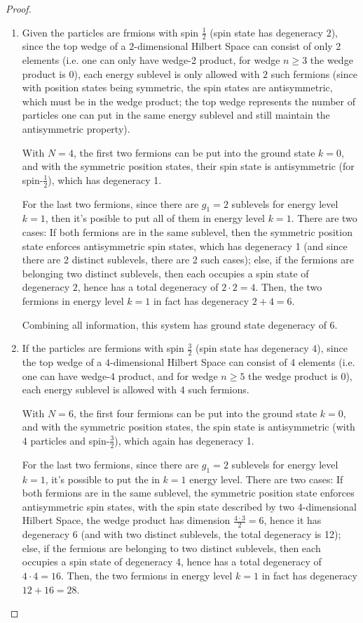 \documentclass{article}
\begin{document}
\begin{proof}
\begin{enumerate}
        \hfil

        \item Given the particles are frmions with spin $\frac{1}{2}$ (spin state has degeneracy $2$), since the top wedge of a $2$-dimensional Hilbert Space can consist of only 2 elements (i.e. one can only have wedge-2 product, for wedge $n\geq 3$ the wedge product is $0$), each energy sublevel is only allowed with $2$ such fermions (since with position states being symmetric, the spin states are antisymmetric, which must be in the wedge product; the top wedge represents the number of particles one can put in the same energy sublevel and still maintain the antisymmetric property). 
        
        With $N=4$, the first two fermions can be put into the ground state $k=0$, and with the symmetric position states, their spin state is antisymmetric (for spin-$\frac{1}{2}$), which has degeneracy 1.
        
        For the last two fermions, since there are $g_1=2$ sublevels for energy level $k=1$, then it's posible to put all of them in energy level $k=1$. There are two cases: If both fermions are in the same sublevel, then the symmetric position state enforces antisymmetric spin states, which has degeneracy 1 (and since there are 2 distinct sublevels, there are 2 such cases); else, if the fermions are belonging two distinct sublevels, then each occupies a spin state of degeneracy $2$, hence has a total degeneracy of $2\cdot 2=4$. Then, the two fermions in energy level $k=1$ in fact has degeneracy $2+4=6$.

        Combining all information, this system has ground state degeneracy of $6$.

        \hfil

        \item If the particles are fermions with spin $\frac{3}{2}$ (spin state has degeneracy $4$), since the top wedge of a $4$-dimensional Hilbert Space can consist of 4 elements (i.e. one can have wedge-4 product, and for wedge $n\geq 5$ the wedge product is $0$), each energy sublevel is allowed with 4 such fermions.
        
        With $N=6$, the first four fermions can be put into the ground state $k=0$, and with the symmetric position states, the spin state is antisymmetric (with 4 particles and spin-$\frac{3}{2}$), which again has degeneracy 1.

        For the last two fermions, since there are $g_1=2$ sublevels for energy level $k=1$, it's possible to put the in $k=1$ energy level. There are two cases: If both fermions are in the same sublevel, the symmetric position state enforces antisymmetric spin states, with the spin state described by two 4-dimensional Hilbert Space, the wedge product has dimension $\frac{4\cdot 3}{2}=6$, hence it has degeneracy $6$ (and with two distinct sublevels, the total degeneracy is 12); else, if the fermions are belonging to two distinct sublevels, then each occupies a spin state of degeneracy 4, hence has a total degeneracy of $4\cdot 4=16$. Then, the two fermions in energy level $k=1$ in fact has degeneracy $12+16=28$.


\end{enumerate}
\end{proof}
\end{document}
